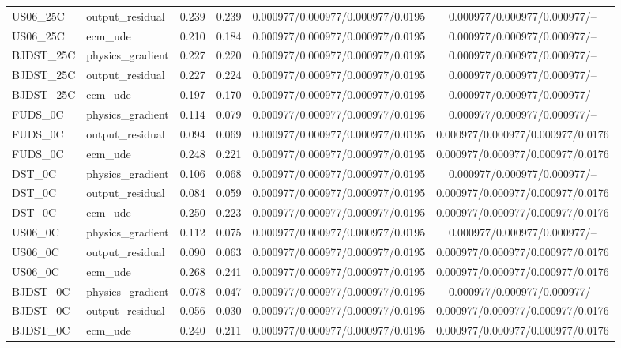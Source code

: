 \begin{table}[!t]
\begin{tabular}{llrrcc}
US06\_25C & output\_residual & 0.239 & 0.239 & 0.000977/0.000977/0.000977/0.0195 & 0.000977/0.000977/0.000977/-- \\
US06\_25C & ecm\_ude & 0.210 & 0.184 & 0.000977/0.000977/0.000977/0.0195 & 0.000977/0.000977/0.000977/-- \\
BJDST\_25C & physics\_gradient & 0.227 & 0.220 & 0.000977/0.000977/0.000977/0.0195 & 0.000977/0.000977/0.000977/-- \\
BJDST\_25C & output\_residual & 0.227 & 0.224 & 0.000977/0.000977/0.000977/0.0195 & 0.000977/0.000977/0.000977/-- \\
BJDST\_25C & ecm\_ude & 0.197 & 0.170 & 0.000977/0.000977/0.000977/0.0195 & 0.000977/0.000977/0.000977/-- \\
FUDS\_0C & physics\_gradient & 0.114 & 0.079 & 0.000977/0.000977/0.000977/0.0195 & 0.000977/0.000977/0.000977/-- \\
FUDS\_0C & output\_residual & 0.094 & 0.069 & 0.000977/0.000977/0.000977/0.0195 & 0.000977/0.000977/0.000977/0.0176 \\
FUDS\_0C & ecm\_ude & 0.248 & 0.221 & 0.000977/0.000977/0.000977/0.0195 & 0.000977/0.000977/0.000977/0.0176 \\
DST\_0C & physics\_gradient & 0.106 & 0.068 & 0.000977/0.000977/0.000977/0.0195 & 0.000977/0.000977/0.000977/-- \\
DST\_0C & output\_residual & 0.084 & 0.059 & 0.000977/0.000977/0.000977/0.0195 & 0.000977/0.000977/0.000977/0.0176 \\
DST\_0C & ecm\_ude & 0.250 & 0.223 & 0.000977/0.000977/0.000977/0.0195 & 0.000977/0.000977/0.000977/0.0176 \\
US06\_0C & physics\_gradient & 0.112 & 0.075 & 0.000977/0.000977/0.000977/0.0195 & 0.000977/0.000977/0.000977/-- \\
US06\_0C & output\_residual & 0.090 & 0.063 & 0.000977/0.000977/0.000977/0.0195 & 0.000977/0.000977/0.000977/0.0176 \\
US06\_0C & ecm\_ude & 0.268 & 0.241 & 0.000977/0.000977/0.000977/0.0195 & 0.000977/0.000977/0.000977/0.0176 \\
BJDST\_0C & physics\_gradient & 0.078 & 0.047 & 0.000977/0.000977/0.000977/0.0195 & 0.000977/0.000977/0.000977/-- \\
BJDST\_0C & output\_residual & 0.056 & 0.030 & 0.000977/0.000977/0.000977/0.0195 & 0.000977/0.000977/0.000977/0.0176 \\
BJDST\_0C & ecm\_ude & 0.240 & 0.211 & 0.000977/0.000977/0.000977/0.0195 & 0.000977/0.000977/0.000977/0.0176 \\

\end{tabular}
\end{table}
